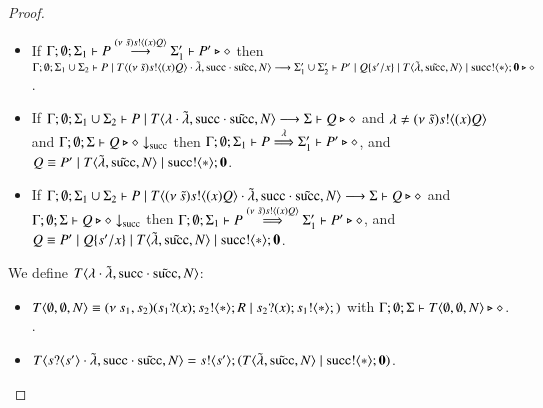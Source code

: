 \begin{proof}
\begin{itemize}
		\item	If $\Gamma; \emptyset; \Sigma_1 \vdash P \stackrel{(\nu\ \tilde{s})s ! \langle (x)Q \rangle}{\longrightarrow} \Sigma_1' \vdash P' \triangleright \diamond$
			then
			$\Gamma; \emptyset; \Sigma_1 \cup \Sigma_2 \vdash P \;|\; T\langle (\nu\ \tilde{s})s ! \langle (x)Q \rangle \cdot \tilde{\lambda}, \textrm{succ} \cdot \tilde{\textrm{succ}}, N \rangle \longrightarrow \Sigma_1' \cup \Sigma_2' \vdash P' \;|\; Q\{s'/x \} \;|\; T\langle \tilde{\lambda}, \tilde{\textrm{succ}}, N \rangle \;|\; \textrm{succ} ! \langle \ast \rangle ; \mathbf{0} \triangleright \diamond$.


		\item	If $\Gamma; \emptyset; \Sigma_1 \cup \Sigma_2 \vdash P \;|\; T\langle \lambda \cdot \tilde{\lambda}, \textrm{succ} \cdot \tilde{\textrm{succ}}, N \rangle \longrightarrow \Sigma \vdash Q \triangleright \diamond$
			and $\lambda\not=(\nu\ \tilde{s})s ! \langle (x)Q \rangle$
			and $\Gamma; \emptyset; \Sigma \vdash Q \triangleright \diamond \downarrow_{\textrm{succ}}$ then
			$\Gamma; \emptyset; \Sigma_1 \vdash P \stackrel{\lambda}{\Longrightarrow} \Sigma_1' \vdash P' \triangleright \diamond$,
			and $Q \equiv P' \;|\; T\langle \tilde{\lambda}, \tilde{\textrm{succ}}, N \rangle \;|\; \textrm{succ} ! \langle \ast \rangle ; \mathbf{0}$.

		\item	If $\Gamma; \emptyset; \Sigma_1 \cup \Sigma_2 \vdash P \;|\; T\langle (\nu\ \tilde{s})s ! \langle (x)Q \rangle \cdot \tilde{\lambda}, \textrm{succ} \cdot \tilde{\textrm{succ}}, N \rangle \longrightarrow \Sigma \vdash Q \triangleright \diamond$
			and $\Gamma; \emptyset; \Sigma \vdash Q \triangleright \diamond \downarrow_{\textrm{succ}}$ then
			$\Gamma; \emptyset; \Sigma_1 \vdash P \stackrel{(\nu\ \tilde{s})s ! \langle (x)Q \rangle}{\Longrightarrow} \Sigma_1' \vdash P' \triangleright \diamond$,
			and $Q \equiv P' \;|\; Q \{s'/x \} \;|\; T\langle \tilde{\lambda}, \tilde{\textrm{succ}}, N \rangle \;|\; \textrm{succ} ! \langle \ast \rangle ; \mathbf{0}$.


	\end{itemize}

	
	We define $T\langle \lambda \cdot \tilde{\lambda}, \textrm{succ} \cdot \tilde{\textrm{succ}}, N \rangle$:

	\begin{itemize}
		\item	$T\langle \emptyset, \emptyset, N \rangle \equiv (\nu\ s_1, s_2)(s_1 ? (x) ; s_2 ! \langle \ast \rangle ; R \;|\; s_2 ? (x) ; s_1 ! \langle \ast \rangle ; )$ with
			$\Gamma; \emptyset; \Sigma \vdash T\langle \emptyset, \emptyset, N \rangle \triangleright \diamond$.
			.

		\item	$T\langle s ? \langle s' \rangle \cdot \tilde{\lambda}, \textrm{succ} \cdot \tilde{\textrm{succ}}, N \rangle = s ! \langle s' \rangle ; (T\langle \tilde{\lambda}, \tilde{\textrm{succ}}, N \rangle \;|\; \textrm{succ} ! \langle \ast \rangle ; \mathbf{0})$.


\end{itemize}
\end{proof}

